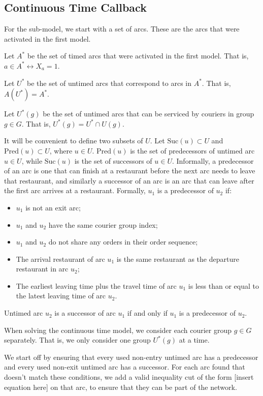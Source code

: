 \documentclass{article}
\newcommand{\Pred}{\text{Pred}}
\newcommand{\Suc}{\text{Suc}}
\begin{document}
\subsection{Continuous Time Callback}

For the sub-model, we start with a set of arcs. These are the arcs that were activated in the first model.

Let $A^*$ be the set of timed arcs that were activated in the first model. That is, $a\in A^*\leftrightarrow X_a=1$.

Let $U^*$ be the set of untimed arcs that correspond to arcs in $A^*$. That is, $A(U^*)=A^*$.

Let $U^*(g)$ be the set of untimed arcs that can be serviced by couriers in group $g\in G$. That is, $U^*(g)=U^*\cap U(g)$.

It will be convenient to define two subsets of $U$. Let $\Suc(u)\subset U$ and $\Pred(u)\subset U$, where $u\in U$. $\Pred(u)$ is the set of predecessors of untimed arc $u\in U$, while $\Suc(u)$ is the set of successors of $u\in U$. Informally, a predecessor of an arc is one that can finish at a restaurant before the next arc needs to leave that restaurant, and similarly a successor of an arc is an arc that can leave after the first arc arrives at a restaurant. Formally, $u_1$ is a predecessor of $u_2$ if:
\begin{itemize}
\item $u_1$ is not an exit arc;
\item $u_1$ and $u_2$ have the same courier group index;
\item $u_1$ and $u_2$ do not share any orders in their order sequence;
\item The arrival restaurant of arc $u_1$ is the same restaurant as the departure restaurant in arc $u_2$;
\item The earliest leaving time plus the travel time of arc $u_1$ is less than or equal to the latest leaving time of arc $u_2$.
\end{itemize}

Untimed arc $u_2$ is a successor of arc $u_1$ if and only if $u_1$ is a predecessor of $u_2$.

When solving the continuous time model, we consider each courier group $g\in G$ separately. That is, we only consider one group $U^*(g)$ at a time.

We start off by ensuring that every used non-entry untimed arc has a predecessor and every used non-exit untimed arc has a successor. For each arc found that doesn't match these conditions, we add a valid inequality cut of the form [insert equation here] on that arc, to ensure that they can be part of the network.
\end{document}

